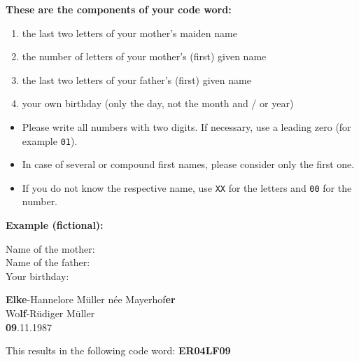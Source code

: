 \documentclass[11pt,twoside,a4paper]{article}
\begin{document}
\begin{mdframed}[
    linewidth=1pt,
    linecolor=black,
    skipabove=1em,
    skipbelow=1em,
    ]

    \textbf{These are the components of your code word:}

    \begin{enumerate}[itemsep=0pt, parsep=0pt]
        \item the last two letters of your mother's maiden name
        \item the number of letters of your mother's (first) given name
        \item the last two letters of your father's (first) given name
        \item your own birthday (only the day, not the month and / or year)
    \end{enumerate}


    \begin{itemize}[itemsep=0pt, parsep=0pt]
        \item Please write all numbers with two digits.
        If necessary, use a leading zero (for example \texttt{01}).
        \item In case of several or compound first names, please consider only the first one.
        \item If you do not know the respective name, use \texttt{XX} for the letters and \texttt{00} for the number.
    \end{itemize}

    \textbf{Example (fictional):}

    \begin{minipage}{0.3\linewidth}
        Name of the mother:\\
        Name of the father:\\
        Your birthday:
    \end{minipage}
    \begin{minipage}{0.7\textwidth}
        \textbf{Elke}-Hannelore Müller née Mayerhof\textbf{er}\\
        Wo\textbf{lf}-Rüdiger Müller\\
        \textbf{09}.11.1987
    \end{minipage}

    This results in the following code word: \textbf{ER04LF09}

\end{mdframed}
\end{document}
